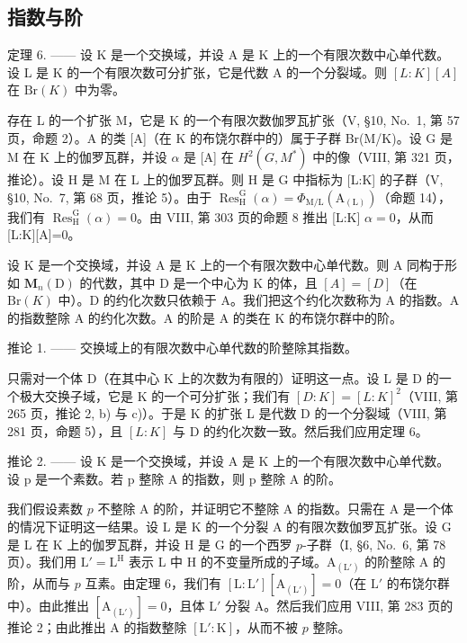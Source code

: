 \subsection{指数与阶}

定理 6. —— 设 K 是一个交换域，并设 A 是 K 上的一个有限次数中心单代数。设 L 是 K 的一个有限次数可分扩张，它是代数 A 的一个分裂域。则 \([L:K][A]\) 在 \(\mathrm{Br}(K)\) 中为零。

存在 L 的一个扩张 M，它是 K 的一个有限次数伽罗瓦扩张（V, §10, No.~1, 第 57 页，命题 2）。A 的类 {[}A{]}（在 K 的布饶尔群中的）属于子群 Br(M/K)。设 G 是 M 在 K 上的伽罗瓦群，并设 \(\alpha\) 是 {[}A{]} 在 \(H^{2}(G,M^{*})\) 中的像（VIII, 第 321 页，推论）。设 H 是 M 在 L 上的伽罗瓦群。则 H 是 G 中指标为 {[}L:K{]} 的子群（V, §10, No.~7, 第 68 页，推论 5）。由于 \(\operatorname{Res}_{\mathrm{H}}^{\mathrm{G}}(\alpha)=\Phi_{\mathrm{M/L}}(\mathrm{A}_{(\mathrm{L})})\)（命题 14），我们有 \(\operatorname{Res}_{\mathrm{H}}^{\mathrm{G}}(\alpha)=0\)。由 VIII, 第 303 页的命题 8 推出 {[}L:K{]} \(\alpha=0\)，从而 {[}L:K{]}{[}A{]}=0。

设 K 是一个交换域，并设 A 是 K 上的一个有限次数中心单代数。则 A 同构于形如 \(\mathbf{M}_{n}(\mathrm{D})\) 的代数，其中 D 是一个中心为 K 的体，且 \([A]=[D]\)（在 \(\mathrm{Br}(K)\) 中）。D 的约化次数只依赖于 A。我们把这个约化次数称为 A 的指数。A 的指数整除 A 的约化次数。A 的阶是 A 的类在 K 的布饶尔群中的阶。

推论 1. —— 交换域上的有限次数中心单代数的阶整除其指数。

只需对一个体 D（在其中心 K 上的次数为有限的）证明这一点。设 L 是 D 的一个极大交换子域，它是 K 的一个可分扩张；我们有 \([D:K]=[L:K]^{2}\)（VIII, 第 265 页，推论 2, b) 与 c)）。于是 K 的扩张 L 是代数 D 的一个分裂域（VIII, 第 281 页，命题 5），且 \([L:K]\) 与 D 的约化次数一致。然后我们应用定理 6。

推论 2. —— 设 K 是一个交换域，并设 A 是 K 上的一个有限次数中心单代数。设 p 是一个素数。若 p 整除 A 的指数，则 p 整除 A 的阶。

我们假设素数 \(p\) 不整除 A 的阶，并证明它不整除 A 的指数。只需在 A 是一个体的情况下证明这一结果。设 L 是 K 的一个分裂 A 的有限次数伽罗瓦扩张。设 G 是 L 在 K 上的伽罗瓦群，并设 H 是 G 的一个西罗 \(p\)-子群（I, §6, No.~6, 第 78 页）。我们用 \(\mathrm{L}' = \mathrm{L}^{\mathrm{H}}\) 表示 L 中 H 的不变量所成的子域。\(\mathrm{A}_{(\mathrm{L}')}\) 的阶整除 A 的阶，从而与 \(p\) 互素。由定理 6，我们有 \([\mathrm{L}:\mathrm{L}'][\mathrm{A}_{(\mathrm{L}')}] = 0\)（在 \(\mathrm{L}'\) 的布饶尔群中）。由此推出 \([\mathrm{A}_{(\mathrm{L}')}] = 0\)，且体 \(\mathrm{L}'\) 分裂 A。然后我们应用 VIII, 第 283 页的推论 2；由此推出 A 的指数整除 \([\mathrm{L}':\mathrm{K}]\)，从而不被 \(p\) 整除。

